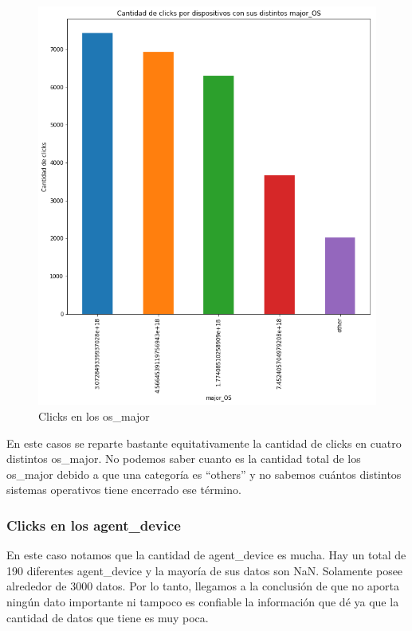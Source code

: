 \documentclass[a4paper, 12pt]{article}
\begin{document}
		\FloatBarrier
		\begin{figure}[h]
			\centering
			\includegraphics[scale = 0.5]{images/clicks/clicks_major_OS.png}
			\caption{Clicks en los os\_major}
		\end{figure}
		\FloatBarrier

		 En este casos se reparte bastante equitativamente la cantidad de clicks en cuatro distintos os\_major.
		No podemos saber cuanto es la cantidad total de los os\_major debido a que una categoría es ``others'' y no sabemos
		cuántos distintos sistemas operativos tiene encerrado ese término.

	\subsubsection{Clicks en los agent\_device}
		 En este caso notamos que la cantidad de agent\_device es mucha. Hay un total de 190 diferentes agent\_device
		y la mayoría de sus datos son NaN. Solamente posee alrededor de 3000 datos. Por lo tanto, llegamos a la conclusión
		de que no aporta ningún dato importante ni tampoco es confiable la información que dé ya que la cantidad de datos
		que tiene es muy poca.
\end{document}
